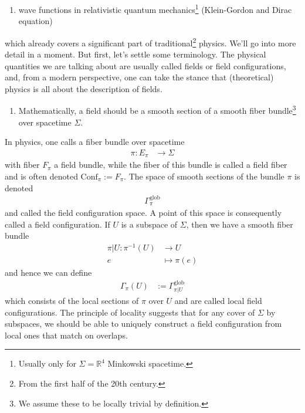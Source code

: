 \begin{enumerate}
\begin{enumerate}
potentials in electrodynamics\footnote{Usually only for $\Sigma = \mathbb{R}^{4}$ as Minkowski spacetime, but possibly also on arbitrary spacetimes.}
\item[$\bullet$]
wave functions in relativistic quantum mechanics\footnote{Usually only for $\Sigma = \mathbb{R}^{4}$ Minkowski spacetime.} (Klein-Gordon and Dirac equation)
\end{enumerate}
which already covers a significant part of traditional\footnote{From the first half of the 20th century.} physics.
We'll go into more detail in a moment.
But first, let's settle some terminology.
The physical quantities we are talking about are usually called fields or field configurations, and,  from a modern perspective, one can take the stance that (theoretical) physics is all about the description of fields.
\begin{enumerate}
\item[$\pmb{\hookrightarrow}$]
Mathematically, a field should be a smooth section of a smooth fiber bundle\footnote{We assume these to be locally trivial by definition.} over spacetime $\Sigma$.
\end{enumerate}
In physics, one calls a fiber bundle over spacetime
\begin{align*}
  \pi
  \colon
  E_{\pi}
  &\rightarrow
  \Sigma
\end{align*}
with fiber $F_{\pi}$ a field bundle, while the fiber of this bundle is called a field fiber and is often denoted $\mathrm{Conf}_{\pi} := F_{\pi}$.
The space of smooth sections of the bundle $\pi$ is denoted
\begin{align*}
  \Gamma_{\pi}^{\mathrm{glob}}
\end{align*}
and called the field configuration space.
A point of this space is consequently called a field configuration.
If $U$ is a subspace of $\Sigma$, then we have a smooth fiber bundle
\begin{align*}
  \pi
  \vert
  U
  \colon
  \pi^{-1}(U)
  &\rightarrow
  U
  \\
  e
  &\mapsto
  \pi(e)
\end{align*}
and hence we can define
\begin{align*}
  \Gamma_{\pi}(U)
  &:=
  \Gamma_{\pi \vert U}^{\mathrm{glob}}
\end{align*}
which consists of the local sections of $\pi$ over $U$ and are called local field configurations.
The principle of locality suggests that for any cover of $\Sigma$ by subspaces, we should be able to uniquely construct a field configuration from local ones that match on overlaps.

\end{enumerate}
